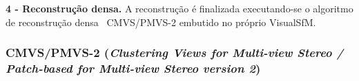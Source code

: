 \noindent\textbf{4 - Reconstrução densa.} A reconstrução é finalizada
executando-se o algoritmo de reconstrução densa~\cite{gavadense} CMVS/PMVS-2 embutido
no próprio VisualSfM.

\subsubsection{CMVS/PMVS-2 (\emph{Clustering Views for Multi-view Stereo /
Patch-based for Multi-view Stereo version 2})}


